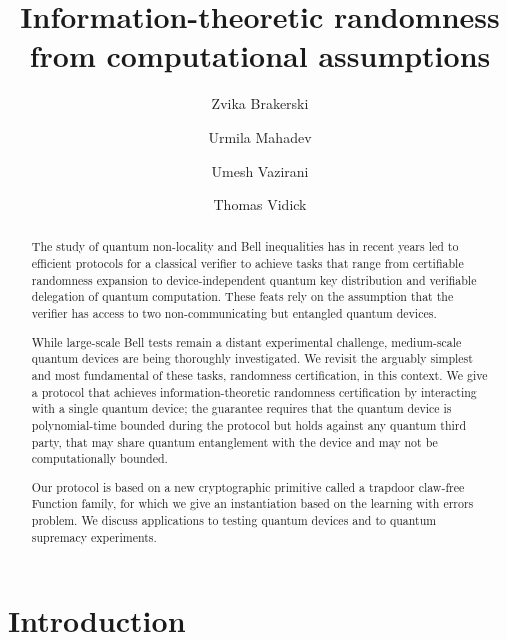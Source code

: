 \documentclass[11pt]{article}
\theoremstyle{remark}
\theoremstyle{definition}
\begin{document}
\title{Information-theoretic randomness from computational assumptions}
\author{Zvika Brakerski \and Urmila Mahadev \and Umesh Vazirani \and Thomas Vidick}
\date{}
\maketitle

\noteswarning

\begin{abstract}
The study of quantum non-locality and Bell inequalities has in recent years led to efficient protocols for a classical verifier to achieve tasks that range from certifiable randomness expansion to device-independent quantum key distribution and verifiable delegation of quantum computation. These feats rely on the assumption that the verifier has access to two non-communicating but entangled quantum devices. 

While large-scale Bell tests remain a distant experimental challenge, medium-scale quantum devices are being thoroughly investigated. We revisit the arguably simplest and most fundamental of these tasks, randomness certification, in this context. We give a protocol that achieves information-theoretic randomness certification by interacting with a single quantum device; the guarantee requires that the quantum device is polynomial-time bounded during the protocol but holds against any quantum third party, that may share quantum entanglement with the device and may not be computationally bounded. 

Our protocol is based on a new cryptographic primitive called a trapdoor claw-free Function family, for which we give an instantiation based on the learning with errors problem. We discuss applications to testing quantum devices and to quantum supremacy experiments. 
\end{abstract}

\section{Introduction}
\end{document}
